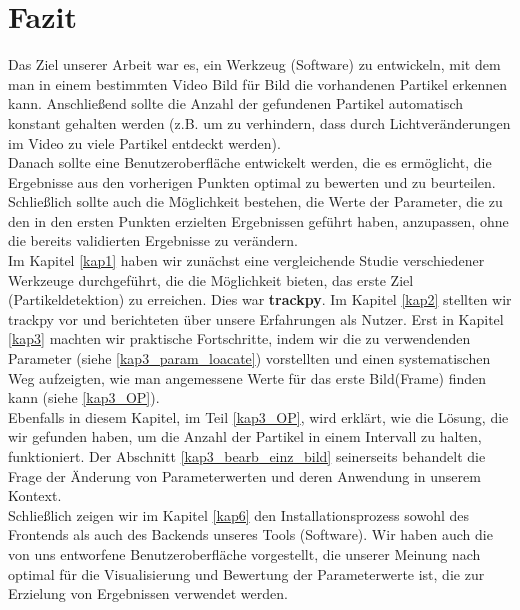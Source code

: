 \chapter{Fazit}
Das Ziel unserer Arbeit war es, ein Werkzeug (Software) zu entwickeln, mit dem man in einem bestimmten Video Bild für Bild die vorhandenen Partikel erkennen kann. Anschließend sollte die Anzahl der gefundenen Partikel automatisch konstant gehalten werden (z.B. um zu verhindern, dass durch Lichtveränderungen im Video zu viele Partikel entdeckt werden).\\ Danach sollte eine Benutzeroberfläche entwickelt werden, die es ermöglicht, die Ergebnisse aus den vorherigen Punkten optimal zu bewerten und zu beurteilen. Schließlich sollte auch die Möglichkeit bestehen, die Werte der Parameter, die zu den in den ersten Punkten erzielten Ergebnissen geführt haben, anzupassen, ohne die bereits validierten Ergebnisse zu verändern.\\
Im Kapitel \ref{kap1} haben wir zunächst eine vergleichende Studie verschiedener Werkzeuge durchgeführt, die die Möglichkeit bieten, das erste Ziel (Partikeldetektion) zu erreichen. Dies war \textbf{trackpy}.  Im Kapitel \ref{kap2} stellten wir trackpy vor und berichteten über unsere Erfahrungen als Nutzer.
Erst in Kapitel \ref{kap3} machten wir praktische Fortschritte, indem wir die zu verwendenden Parameter (siehe \ref{kap3_param_loacate}) vorstellten und einen systematischen Weg aufzeigten, wie man angemessene Werte für das erste Bild(Frame) finden kann (siehe \ref{kap3_OP}).\\
 Ebenfalls in diesem Kapitel, im Teil \ref{kap3_OP}, wird erklärt, wie die Lösung, die wir gefunden haben, um die Anzahl der Partikel in einem Intervall zu halten, funktioniert. Der Abschnitt \ref{kap3_bearb_einz_bild} seinerseits behandelt die Frage der Änderung von Parameterwerten und deren Anwendung in unserem Kontext.\\
Schließlich zeigen wir im Kapitel \ref{kap6} den Installationsprozess sowohl des Frontends als auch des Backends unseres Tools (Software). Wir haben auch die von uns entworfene Benutzeroberfläche vorgestellt, die unserer Meinung nach optimal für die Visualisierung und Bewertung der Parameterwerte ist, die zur Erzielung von Ergebnissen verwendet werden.



